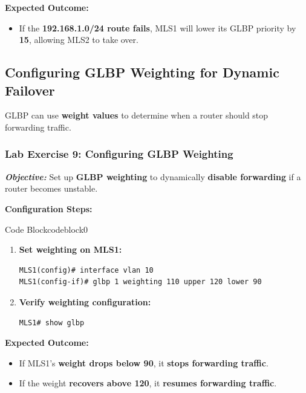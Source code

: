 \documentclass[a4paper]{book}
\begin{document}
\textbf{Expected Outcome:}
\begin{itemize}
\item If the \textbf{192.168.1.0/24 route fails}, MLS1 will lower its GLBP priority by \textbf{15}, 
allowing MLS2 to take over.
\end{itemize}

\subsection{Configuring GLBP Weighting for Dynamic Failover}
GLBP can use \textbf{weight values} to determine when a router should stop forwarding traffic.

\subsubsection{Lab Exercise 9: Configuring GLBP Weighting}
\textbf{\textit{Objective:}} Set up \textbf{GLBP weighting} to dynamically 
\textbf{disable forwarding} if a router becomes unstable.
\vspace{1.5em}

\textbf{Configuration Steps:}

\vspace{1.5em}


\begin{ocg}{Code Block}{codeblock}{0}

\vspace{0.5cm}



\begin{enumerate}
\item \textbf{Set weighting on MLS1:}
\begin{lstlisting}
MLS1(config)# interface vlan 10
MLS1(config-if)# glbp 1 weighting 110 upper 120 lower 90
\end{lstlisting}

\item \textbf{Verify weighting configuration:}
\begin{lstlisting}
MLS1# show glbp
\end{lstlisting}
\end{enumerate}
\end{ocg}



\textbf{Expected Outcome:}
\begin{itemize}
\item If MLS1’s \textbf{weight drops below 90}, it \textbf{stops forwarding traffic}.
\item If the weight \textbf{recovers above 120}, it \textbf{resumes forwarding traffic}.
\end{itemize}
\end{document}

